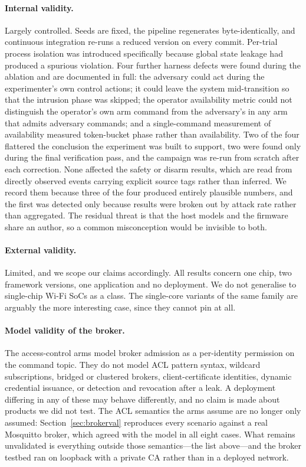 \paragraph{Internal validity.} Largely controlled. Seeds are fixed, the pipeline regenerates
byte-identically, and continuous integration re-runs a reduced version on every commit.
Per-trial process isolation was introduced specifically because global state leakage had produced
a spurious violation. Four further harness defects were found during the ablation and
are documented in full: the adversary could act during the experimenter's own control actions;
it could leave the system mid-transition so that the intrusion phase was skipped; the operator
availability metric could not distinguish the operator's own arm command from the adversary's
in any arm that admits adversary commands; and a single-command measurement of availability
measured token-bucket phase rather than availability. Two of the four flattered the conclusion
the experiment was built to support, two were found only during the final verification pass,
and the campaign was re-run from scratch after each correction. None affected the safety or
disarm results, which are read from directly observed events carrying explicit source tags
rather than inferred. We record them because three of the four produced entirely plausible
numbers, and the first was detected only because results were broken out by attack rate rather
than aggregated. The residual threat is that the host models and the firmware share an author,
so a common misconception would be invisible to both.

\paragraph{External validity.} Limited, and we scope our claims accordingly. All results concern
one chip, two framework versions, one application and no deployment. We do not generalise to
single-chip Wi-Fi SoCs as a class. The single-core variants of the same family are arguably the
more interesting case, since they cannot pin at all.

\paragraph{Model validity of the broker.} The access-control arms model broker admission as a
per-identity permission on the command topic. They do not model ACL pattern syntax, wildcard
subscriptions, bridged or clustered brokers, client-certificate identities, dynamic credential
issuance, or detection and revocation after a leak. A deployment differing in any of these may
behave differently, and no claim is made about products we did not test. The ACL semantics the arms assume are
no longer only assumed: Section~\ref{sec:brokerval} reproduces every scenario against a real
Mosquitto broker, which agreed with the model in all eight cases. What remains unvalidated is
everything outside those semantics---the list above---and the broker testbed ran on loopback
with a private CA rather than in a deployed network.

